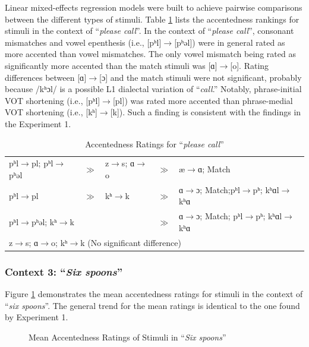 Linear mixed-effects regression models were built to achieve pairwise comparisons between the different types of stimuli. Table \ref{table:pc2} lists the accentedness rankings for stimuli in the context of “\textit{please call}”. In the context of “\textit{please call}”, consonant mismatches and vowel epenthesis (i.e., [pʰl]$\rightarrow$[pʰəl]) were in general rated as more accented than vowel mismatches. The only vowel mismatch being rated as significantly more accented than the match stimuli was [ɑ]$\rightarrow$[o]. Rating differences between [ɑ]$\rightarrow$[ɔ] and the match stimuli were not significant, probably because /kʰɔl/ is a possible L1 dialectal variation of “\textit{call}.” Notably, phrase-initial VOT shortening (i.e., [pʰl]$\rightarrow$[pl]) was rated more accented than phrase-medial VOT shortening (i.e., [kʰ]$\rightarrow$[k]). Such a finding is consistent with the findings in the Experiment 1.

\begin{table}[!h]
  \figSpace
  \centering
  \caption{Accentedness Ratings for “\textit{please call}” }
  \label{table:pc2}%
    \begin{tabular}{lclcl}
    \toprule
 	pʰl$\rightarrow$pl; pʰl$\rightarrow$pʰəl  & $\gg$ &z$\rightarrow$s; ɑ$\rightarrow$o & $\gg$ & æ$\rightarrow$ɑ; Match \\
 	pʰl$\rightarrow$pl& $\gg$ &kʰ$\rightarrow$k& $\gg$ & ɑ$\rightarrow$ɔ; Match;pʰl$\rightarrow$pʰ; kʰɑl$\rightarrow$kʰɑ \\
	\multicolumn{3}{l}{pʰl$\rightarrow$pʰəl; kʰ$\rightarrow$k}&$\gg$&ɑ$\rightarrow$ɔ; Match; pʰl$\rightarrow$pʰ; kʰɑl$\rightarrow$kʰɑ\\
  \multicolumn{5}{l}{z$\rightarrow$s; ɑ$\rightarrow$o; kʰ$\rightarrow$k (No significant difference)} \\
    \bottomrule
    \end{tabular}%
      \figSpace
\end{table}%

\subsubsection{Context 3: “\textit{Six spoons}”}
Figure \ref{fig:ssp2} demonstrates the mean accentedness ratings for stimuli in the context of “\textit{six spoons}”. The general trend for the mean ratings is identical to the one found by Experiment 1. 
\begin{figure}[!h]
  \figSpace
\centering

\caption{Mean Accentedness Ratings of Stimuli in “\textit{Six spoons}”}
\label{fig:ssp2}
\figSpace
\end{figure}

